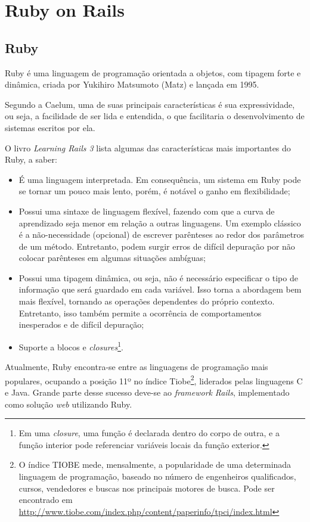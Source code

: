 \section{Ruby on Rails}

\subsection{Ruby}
	Ruby é uma linguagem de programação orientada a objetos, com tipagem forte e dinâmica, criada por Yukihiro Matsumoto (Matz) e lançada em 1995\cite{rubyhistory}. 
	
	Segundo a Caelum\cite{caelum}, uma de suas principais características é sua expressividade, ou seja, a facilidade de ser lida e entendida, o que facilitaria o desenvolvimento de sistemas escritos por ela.
	
	O livro \emph{Learning Rails 3} \cite{rails3} lista algumas das características mais importantes do Ruby, a saber:
\begin{itemize}
\item É uma linguagem interpretada. Em consequência, um sistema em Ruby pode se tornar um pouco mais lento, porém, é notável o ganho em flexibilidade;
\item Possui uma sintaxe de linguagem flexível, fazendo com que a curva de aprendizado seja menor em relação a outras linguagens. Um exemplo clássico é a não-necessidade (opcional) de escrever parênteses ao redor dos parâmetros de um método. Entretanto, podem surgir erros de difícil depuração por não colocar parênteses em algumas situações ambíguas;
\item Possui uma tipagem dinâmica, ou seja, não é necessário especificar o tipo de informação que será guardado em cada variável. Isso torna a abordagem bem mais flexível, tornando as operações dependentes do próprio contexto. Entretanto, isso também permite a ocorrência de comportamentos inesperados e de difícil depuração;
\item Suporte a blocos e \emph{closures}\footnote{Em uma \emph{closure}, uma função é declarada dentro do corpo de outra, e a função interior pode referenciar variáveis locais da função exterior.}.
\end{itemize}
	
	Atualmente, Ruby encontra-se entre as linguagens de programação mais populares, ocupando a posição 11º no índice Tiobe\footnote{O índice TIOBE mede, mensalmente, a popularidade de uma determinada linguagem de programação, baseado no número de engenheiros qualificados, cursos, vendedores e buscas nos principais motores de busca. Pode ser encontrado em \url{http://www.tiobe.com/index.php/content/paperinfo/tpci/index.html} }, liderados pelas linguagens C e Java.   Grande parte desse sucesso deve-se ao \emph{framework} \emph{Rails}, implementado como solução \emph{web} utilizando Ruby.

